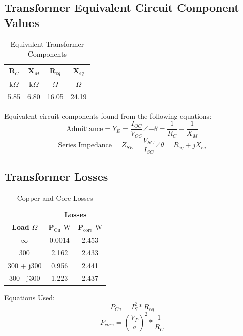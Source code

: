 \documentclass{article}
\begin{document}
\subsection{Transformer Equivalent Circuit Component Values}
\begin{table}[H]
  \centering
  \begin{tabular}{*{4}{c}}
    \textbf{R$_C$} & \textbf{X$_M$}
    & \textbf{R$_{eq}$} & \textbf{X$_{eq}$} \\
    k$\Omega$ & k$\Omega$ &$\Omega$ & $\Omega$ \\
    \hline
    5.85 & 6.80 & 16.05 & 24.19 \\
  \end{tabular}
  \caption{Equivalent Transformer Components}
  \label{tab:equiv_comp}
\end{table}

Equivalent circuit components found from the following equations:
\[\text{Admittance} = Y_E = \frac{I_{OC}}{V_{OC}}\angle{-\theta} =  \frac{1}{R_C} -
\frac{1}{X_M}\]
\[\text{Series Impedance} = Z_{SE} = \frac{V_{SC}}{I_{SC}}\angle{\theta} = R_{eq} +
jX_{eq}\]

\subsection{Transformer Losses}
\begin{table}[H]
  \centering
  \begin{tabular}{*{3}{c}}
    & \multicolumn{2}{c}{\textbf{Losses}} \\
    \textbf{Load} $\Omega$ & \textbf{P$_\text{Cu}$} W & \textbf{P$_\text{core}$} W \\
    \hline
    $\infty$ & 0.0014 & 2.453 \\
    300 & 2.162 & 2.433 \\
    300 + j300 & 0.956 & 2.441 \\
    300 - j300 & 1.223 & 2.437 \\
  \end{tabular}
  \caption{Copper and Core Losses}
  \label{tab:power_losses}
\end{table}

Equations Used:
\[P_{Cu} = I_S^2 * R_{eq}\]
\[P_{core} = (\frac{V_P}{a})^2 * \frac{1}{R_{C}}\]
\end{document}
